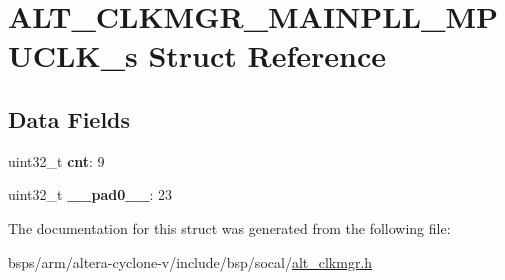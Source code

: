 \hypertarget{structALT__CLKMGR__MAINPLL__MPUCLK__s}{}\section{A\+L\+T\+\_\+\+C\+L\+K\+M\+G\+R\+\_\+\+M\+A\+I\+N\+P\+L\+L\+\_\+\+M\+P\+U\+C\+L\+K\+\_\+s Struct Reference}
\label{structALT__CLKMGR__MAINPLL__MPUCLK__s}
\subsection*{Data Fields}
\begin{DoxyCompactItemize}
\item 
\mbox{\label{structALT__CLKMGR__MAINPLL__MPUCLK__s_ad38e74d8b2434b8b294236f5727bb7e1}} 
uint32\+\_\+t {\bfseries cnt}\+: 9
\item 
\mbox{\label{structALT__CLKMGR__MAINPLL__MPUCLK__s_a6feb167b020e6db66c9e6627eb9eaf70}} 
uint32\+\_\+t {\bfseries \+\_\+\+\_\+pad0\+\_\+\+\_\+}\+: 23
\end{DoxyCompactItemize}


The documentation for this struct was generated from the following file\+:\begin{DoxyCompactItemize}
\item 
bsps/arm/altera-\/cyclone-\/v/include/bsp/socal/\mbox{\hyperlink{alt__clkmgr_8h}{alt\+\_\+clkmgr.\+h}}\end{DoxyCompactItemize}
